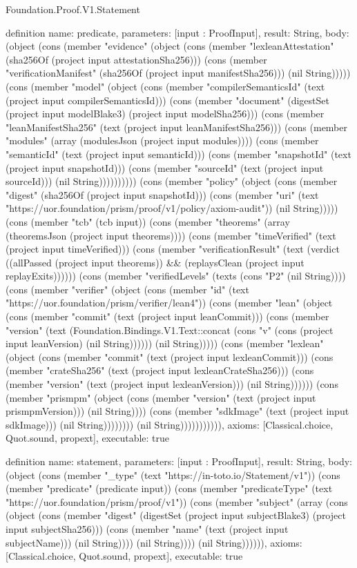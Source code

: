 \begin{lexlean}{Foundation.Proof.V1.Statement}
\begin{semanticmodule}
definition{
  name: predicate,
  parameters: [input : ProofInput],
  result: String,
  body: (object (cons (member "evidence" (object (cons (member "lexleanAttestation" (sha256Of (project input attestationSha256))) (cons (member "verificationManifest" (sha256Of (project input manifestSha256))) (nil String))))) (cons (member "model" (object (cons (member "compilerSemanticsId" (text (project input compilerSemanticsId))) (cons (member "document" (digestSet (project input modelBlake3) (project input modelSha256))) (cons (member "leanManifestSha256" (text (project input leanManifestSha256))) (cons (member "modules" (array (modulesJson (project input modules)))) (cons (member "semanticId" (text (project input semanticId))) (cons (member "snapshotId" (text (project input snapshotId))) (cons (member "sourceId" (text (project input sourceId))) (nil String)))))))))) (cons (member "policy" (object (cons (member "digest" (sha256Of (project input snapshotId))) (cons (member "uri" (text "https://uor.foundation/prism/proof/v1/policy/axiom-audit")) (nil String))))) (cons (member "tcb" (tcb input)) (cons (member "theorems" (array (theoremsJson (project input theorems)))) (cons (member "timeVerified" (text (project input timeVerified))) (cons (member "verificationResult" (text (verdict ((allPassed (project input theorems)) && (replaysClean (project input replayExits)))))) (cons (member "verifiedLevels" (texts (cons "P2" (nil String)))) (cons (member "verifier" (object (cons (member "id" (text "https://uor.foundation/prism/verifier/lean4")) (cons (member "lean" (object (cons (member "commit" (text (project input leanCommit))) (cons (member "version" (text (Foundation.Bindings.V1.Text::concat (cons "v" (cons (project input leanVersion) (nil String)))))) (nil String))))) (cons (member "lexlean" (object (cons (member "commit" (text (project input lexleanCommit))) (cons (member "crateSha256" (text (project input lexleanCrateSha256))) (cons (member "version" (text (project input lexleanVersion))) (nil String)))))) (cons (member "prismpm" (object (cons (member "version" (text (project input prismpmVersion))) (nil String)))) (cons (member "sdkImage" (text (project input sdkImage))) (nil String)))))))) (nil String))))))))))),
  axioms: [Classical.choice, Quot.sound, propext],
  executable: true
}

definition{
  name: statement,
  parameters: [input : ProofInput],
  result: String,
  body: (object (cons (member "_type" (text "https://in-toto.io/Statement/v1")) (cons (member "predicate" (predicate input)) (cons (member "predicateType" (text "https://uor.foundation/prism/proof/v1")) (cons (member "subject" (array (cons (object (cons (member "digest" (digestSet (project input subjectBlake3) (project input subjectSha256))) (cons (member "name" (text (project input subjectName))) (nil String)))) (nil String)))) (nil String)))))),
  axioms: [Classical.choice, Quot.sound, propext],
  executable: true
}


\end{semanticmodule}
\end{lexlean}
